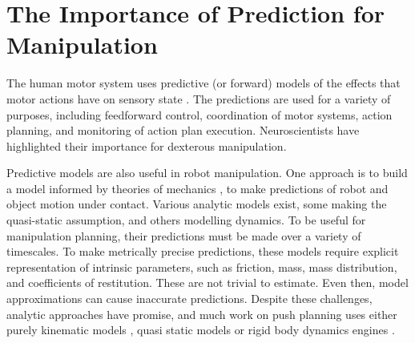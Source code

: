 
\section{The Importance of Prediction for Manipulation}
\label{sec:motivation}
The human motor system uses predictive (or forward) models of the effects that motor actions have on sensory state \citep{flanagan03,flanagan06,mehta02,witney00,johansson92}. The predictions are used for a variety of purposes, including feedforward control, coordination of motor systems, action planning, and monitoring of action plan execution. Neuroscientists have highlighted their importance for dexterous manipulation.



Predictive models are also useful in robot manipulation. One approach is to build a model informed by theories of mechanics \citep{mason_manipulator_1982,lynch_mechanics_1992,lynchmason96,peshkin_motion_1988,cappelleri_designing_2006,mason_mechanics_2001,flickinger2015}, to make predictions of robot and object motion under contact. Various analytic models exist, some making the quasi-static assumption, and others modelling dynamics.  To be useful for manipulation planning, their predictions must be made over a variety of timescales. To make metrically precise predictions, these models require explicit representation of intrinsic parameters, such as friction, mass, mass distribution, and coefficients of restitution. These are not trivial to estimate. Even then, model approximations can cause inaccurate predictions. Despite these challenges, analytic approaches have promise, and much work on push planning uses either purely kinematic models \citep{stillman08ijrr}, quasi static models \citep{Dogar_2010,lynchmason96} or rigid body dynamics engines \cite{zitoetal-iros12,Cosgun2011}. 

